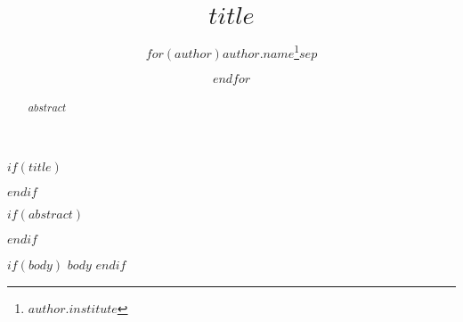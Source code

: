 \documentclass[letterpaper,11pt,twoside,onecolumn,notitlepage]{article}
\title{$title$}
\author{$for(author)$$author.name$\thanks{$author.institute$}$sep$ \and $endfor$}
\begin{document}
$if(title)$
	\maketitle
$endif$


$if(abstract)$
	\hrulefill
	\begin{abstract}
		$abstract$
	\end{abstract}
	\hrulefill
$endif$		

\linenumbers
$if(body)$
	$body$
$endif$
\end{document}
